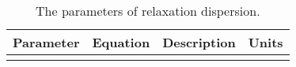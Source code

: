 \latex{\begin{landscape}}
\begin{center}
\begin{small}

\begin{longtable}{llll}

\caption[The parameters of relaxation dispersion.]{The parameters of relaxation dispersion.}

\\
\toprule
Parameter          & Equation                       & Description                                                                   & Units \\
\midrule
\endhead

\bottomrule
\endfoot

\label{table: dispersion parameters}


\end{longtable}
\end{small}
\end{center}
